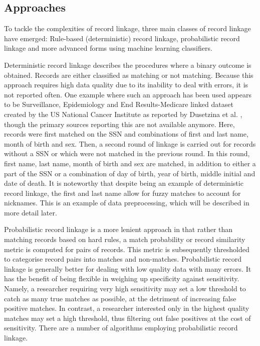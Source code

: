 
\subsection{Approaches}
To tackle the complexities of record linkage, three main classes of record linkage have emerged:
Rule-based (deterministic) record linkage, probabilistic record linkage and more advanced forms using machine learning classifiers.

Deterministic record linkage describes the procedures where a binary outcome is obtained.
Records are either classified as matching or not matching.
Because this approach requires high data quality due to its inability to deal with errors, it is not reported often.
One example where such an approach has been used appears to be Surveillance, Epidemiology and End Results-Medicare linked dataset created by the US National Cancer Institute as reported by Dusetzina et al. \cite{dusetzinaOverviewRecordLinkage2014}, though the primary sources reporting this are not available anymore.
Here, records were first matched on the \ac{SSN} and combinations of first and last name, month of birth and sex.
Then, a second round of linkage is carried out for records without a \ac{SSN} or which were not matched in the previous round.
In this round, first name, last name, month of birth and sex are matched, in addition to either a part of the \ac{SSN} or a combination of day of birth, year of birth, middle initial and date of death.
It is noteworthy that despite being an example of deterministic record linkage, the first and last name allow for fuzzy matches to account for nicknames.
This is an example of data preprocessing, which will be described in more detail later.

Probabilistic record linkage is a more lenient approach in that rather than matching records based on hard rules, a match probability or record similarity metric is computed for pairs of records.
This metric is subsequently thresholded to categorise record pairs into matches and non-matches.
Probabilistic record linkage is generally better for dealing with low quality data with many errors.
It has the benefit of being flexible in weighing up specificity against sensitivity.
Namely, a researcher requiring very high sensitivity may set a low threshold to catch as many true matches as possible, at the detriment of increasing false positive matches.
In contrast, a researcher interested only in the highest quality matches may set a high threshold, thus filtering out false positives at the cost of sensitivity.
There are a number of algorithms employing probabilistic record linkage.

